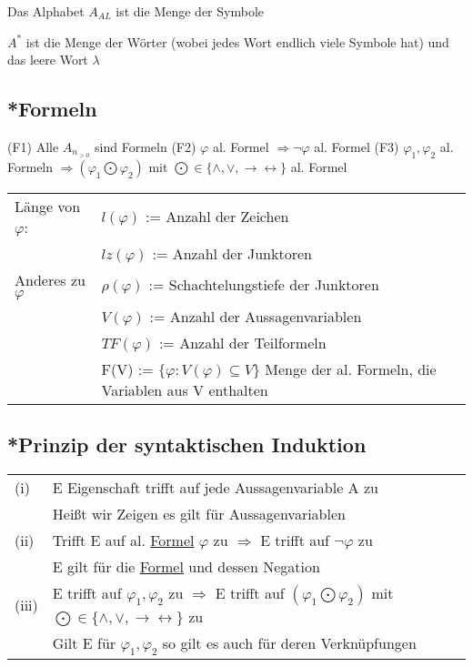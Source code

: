 \documentclass[12pt,a4paper]{article} %
\begin{document}
	Das Alphabet $A_{AL}$ ist die Menge der Symbole
	
	$A^*$ ist die Menge der Wörter (wobei jedes Wort endlich viele Symbole hat) und das leere Wort $\lambda$
	
	\subsection{*Formeln}
	\label{Formel}
	(F1) Alle $A_{n_{> 0}}$ sind Formeln \newline
	(F2) $\varphi$ al. Formel $\Rightarrow \neg \varphi$ al. Formel \newline
	(F3) $\varphi_1, \varphi_2$ al. Formeln $\Rightarrow (\varphi_1 \bigodot \varphi_2)$ mit $\bigodot \in \{\land, \lor, \rightarrow\leftrightarrow\}$ al. Formel
	
	\begin{tabular}{l p{10cm}}
		Länge von $\varphi$: & $l(\varphi)$ := Anzahl der Zeichen \\
		& $lz(\varphi)$ := Anzahl der Junktoren \\
		Anderes zu $\varphi$ & $\rho(\varphi)$ := Schachtelungstiefe der Junktoren \\
		& $V(\varphi)$ := Anzahl der Aussagenvariablen \\
		& $TF(\varphi)$ := Anzahl der Teilformeln \\
		& F(V) := $\{\varphi: V(\varphi)\subseteq V\}$ Menge der al. Formeln, die Variablen aus V enthalten
	\end{tabular}
	
	\subsection{*Prinzip der syntaktischen Induktion}
	\begin{tabular}{l l}
		(i) & E Eigenschaft trifft auf jede Aussagenvariable A zu \\
		& Heißt wir Zeigen es gilt für Aussagenvariablen \\
		(ii) & Trifft E auf al. \hyperref[Formel]{Formel} $\varphi$ zu $\Rightarrow$ E trifft auf $\neg \varphi$ zu \\
		& E gilt für die \hyperref[Formel]{Formel} und dessen Negation \\
		(iii) & E trifft auf $\varphi_1, \varphi_2$ zu $\Rightarrow$ E trifft auf $(\varphi_1 \bigodot \varphi_2)$ mit $\bigodot \in \{\land, \lor, \rightarrow\leftrightarrow\}$ zu \\
		& Gilt E für $\varphi_1, \varphi_2$ so gilt es auch für deren Verknüpfungen
	\end{tabular}
	
\end{document}
